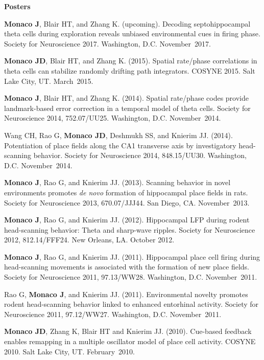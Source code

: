 \documentclass[10pt]{article}
\begin{document}
\begin{description}
\item \textbf{Posters}
\item[\quad] \textbf{Monaco J}, Blair HT, and Zhang K. (upcoming). Decoding septohippocampal theta cells during exploration reveals unbiased environmental cues in firing phase. Society for Neuroscience 2017. Washington, D.C. November~2017.
\item[\quad] \textbf{Monaco JD}, Blair HT, and Zhang K. (2015). Spatial rate/phase correlations in theta cells can stabilize randomly drifting path integrators. COSYNE 2015. Salt Lake City, UT. March~2015.
\item[\quad] \textbf{Monaco J}, Blair HT, and Zhang K. (2014). Spatial rate/phase codes provide landmark-based error correction in a temporal model of theta cells. Society for Neuroscience 2014, 752.07/UU25. Washington, D.C. November~2014.
\item[\quad] Wang CH, Rao G, \textbf{Monaco JD}, Deshmukh SS, and Knierim JJ. (2014). Potentiation of place fields along the CA1 transverse axis by investigatory head-scanning behavior. Society for Neuroscience 2014, 848.15/UU30. Washington, D.C. November~2014.
\item[\quad] \textbf{Monaco J}, Rao G, and Knierim JJ. (2013). Scanning behavior in novel environments promotes \emph{de novo} formation of hippocampal place fields in rats. Society for Neuroscience 2013, 670.07/JJJ44. San Diego, CA. November~2013.
\item[\quad] \textbf{Monaco J}, Rao G, and Knierim JJ. (2012). Hippocampal LFP during rodent head-scanning behavior: Theta and sharp-wave ripples. Society for Neuroscience 2012, 812.14/FFF24. New Orleans, LA. October 2012.
\item[\quad] \textbf{Monaco J}, Rao G, and Knierim JJ. (2011). Hippocampal place cell firing during head-scanning movements is associated with the formation of new place fields. Society for Neuroscience 2011, 97.13/WW28. Washington, D.C. November~2011.
\item[\quad] Rao G, \textbf{Monaco J}, and Knierim JJ. (2011). Environmental novelty promotes rodent head-scanning behavior linked to enhanced entorhinal activity. Society for Neuroscience 2011, 97.12/WW27. Washington, D.C. November~2011.
\item[\quad] \textbf{Monaco JD}, Zhang K, Blair HT and Knierim JJ. (2010). Cue-based feedback enables remapping in a multiple oscillator model of place cell activity. COSYNE 2010. Salt Lake City, UT. February~2010.

\end{description}
\end{document}
